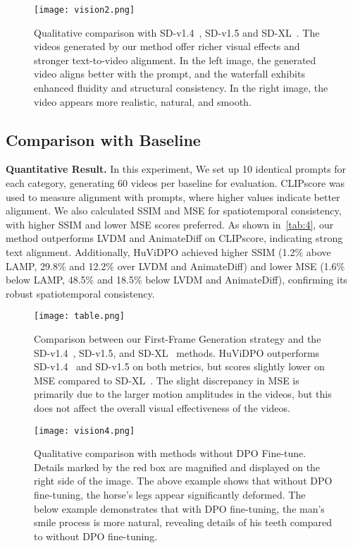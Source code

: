 \begin{figure*}[t]

  \centering
  \texttt{[image: vision2.png]}

   \caption{Qualitative comparison with SD-v1.4~\cite{rombach2022high}, SD-v1.5 and SD-XL~\cite{podell2023sdxl}. The videos generated by our method offer richer visual effects and stronger text-to-video alignment. In the left image, the generated video aligns better with the prompt, and the waterfall exhibits enhanced fluidity and structural consistency. In the right image, the video appears more realistic, natural, and smooth.}
   \label{fig:7}
\end{figure*}



\subsection{Comparison with Baseline}

\noindent\textbf{Quantitative Result.} In this experiment, We set up 10 identical prompts for each category, generating 60 videos per baseline for evaluation. CLIPscore was used to measure alignment with prompts, where higher values indicate better alignment. We also calculated SSIM and MSE for spatiotemporal consistency, with higher SSIM and lower MSE scores preferred. As shown in~\cref{tab:4}, our method outperforms LVDM and AnimateDiff on CLIPscore, indicating strong text alignment. Additionally, HuViDPO achieved higher SSIM (1.2\% above LAMP, 29.8\% and 12.2\% over LVDM and AnimateDiff) and lower MSE (1.6\% below LAMP, 48.5\% and 18.5\% below LVDM and AnimateDiff), confirming its robust spatiotemporal consistency.

\begin{figure}[!h]
  \centering
    \texttt{[image: table.png]}

   \caption{Comparison between our First-Frame Generation strategy and the SD-v1.4~\cite{rombach2022high}, SD-v1.5, and SD-XL~\cite{podell2023sdxl} methods. HuViDPO outperforms SD-v1.4~\cite{rombach2022high} and SD-v1.5 on both metrics, but scores slightly lower on MSE compared to SD-XL~\cite{podell2023sdxl}. The slight discrepancy in MSE is primarily due to the larger motion amplitudes in the videos, but this does not affect the overall visual effectiveness of the videos.}
   \label{fig:6}
\end{figure}

\begin{figure}[!h]
  \centering
  \texttt{[image: vision4.png]}
  \caption{Qualitative comparison with methods without DPO Fine-tune. Details marked by the red box are magnified and displayed on the right side of the image. The above example shows that without DPO fine-tuning, the horse's legs appear significantly deformed. The below example demonstrates that with DPO fine-tuning, the man's smile process is more natural, revealing details of his teeth compared to without DPO fine-tuning.}
  \label{fig:9}
\end{figure}


